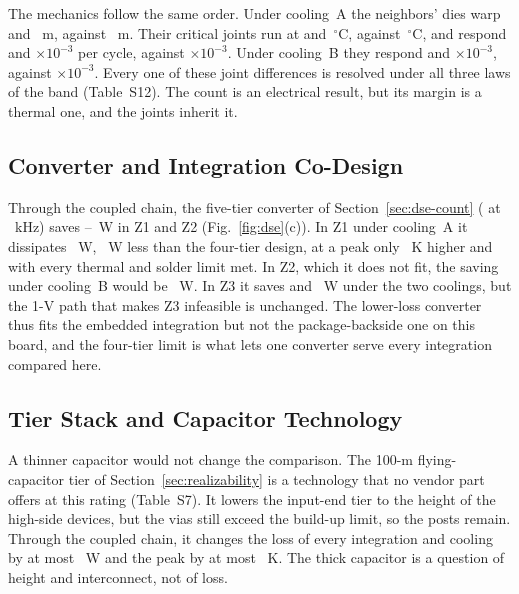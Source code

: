 The mechanics follow the same order. Under cooling~A the neighbors' dies warp \WrMloAZoneWarp{} and
\WrMhiAZoneWarp~\textmu m, against \WarpAZone~\textmu m. Their critical joints run at
\WrMloAZoneTsj{} and \WrMhiAZoneTsj\,$^\circ$C, against \MvTsjAZone\,$^\circ$C, and respond
\WrMloAZoneEps{} and \WrMhiAZoneEps$\times10^{-3}$ per cycle, against \MvEpsAZone$\times10^{-3}$.
Under cooling~B they respond \WrMloBZoneEps{} and \WrMhiBZoneEps$\times10^{-3}$, against
\MvEpsBZone$\times10^{-3}$. Every one of these joint differences is resolved under all three laws of
the band (Table~S12). The count is an electrical result, but its margin is a thermal one, and the
joints inherit it.

\subsection{Converter and Integration Co-Design}\label{sec:explore-codesign}
Through the coupled chain, the five-tier converter of Section~\ref{sec:dse-count}
(\FrDseTfiveSqTopo{} at \FrDseTfiveSqFsw~kHz) saves \FrTfiveSaveLo--\FrTfiveSaveHi~W in Z1 and Z2
(Fig.~\ref{fig:dse}(c)). In Z1 under cooling~A it dissipates \WrFiveAZonePloss~W,
\WrFiveAZonedPAbs~W less than the four-tier design, at a peak only \WrFiveAZonedTAbs~K higher and
with every thermal and solder limit met. In Z2, which it does not fit, the saving under cooling~B
would be \WrFiveBZtwodPAbs~W. In Z3 it saves \WrFiveAZthreedPAbs{} and \WrFiveBZthreedPAbs~W under
the two coolings, but the 1-V path that makes Z3 infeasible is unchanged. The lower-loss converter
thus fits the embedded integration but not the package-backside one on this board, and the
four-tier limit is what lets one converter serve every integration compared here.

\subsection{Tier Stack and Capacitor Technology}\label{sec:explore-thin}
A thinner capacitor would not change the comparison. The 100-\textmu m flying-capacitor tier of
Section~\ref{sec:realizability} is a technology that no vendor part offers at this rating
(Table~S7). It lowers the input-end tier to the height of the high-side devices, but the vias still
exceed the build-up limit, so the posts remain. Through the coupled chain, it changes the loss of every
integration and cooling by at most \WrThinDPAbsMax~W and the peak by at most \WrThinDTAbsMax~K. The thick capacitor is a question of height and
interconnect, not of loss.

